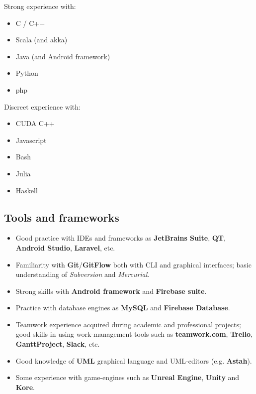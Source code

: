 \documentclass[letterpaper]{twentysecondcv} %
\begin{document}
\begin{minipage}[t]{0.45\linewidth}
	Strong experience with:
	\small
	\begin{itemize}[noitemsep]
		\item C / C++
		\item Scala (and akka)
		\item Java (and Android framework)
		\item Python
		\item php
	\end{itemize}
\end{minipage}
\begin{minipage}[t]{0.45\linewidth}
	Discreet experience with:
	\begin{itemize}[noitemsep,nolistsep]
		\item CUDA C++
		\item Javascript
		\item Bash
		\item Julia
		\item Haskell
	\end{itemize}
\end{minipage}


\subsection{Tools and frameworks}
\begin{itemize}[noitemsep,nolistsep]
	\item Good practice with IDEs and frameworks as \textbf{JetBrains Suite}, \textbf{QT}, \textbf{Android Studio}, \textbf{Laravel}, etc.
	\item Familiarity with \textbf{Git}/\textbf{GitFlow} both with CLI and graphical interfaces; basic understanding of \textit{Subversion} and \textit{Mercurial}.
	\item Strong skills with \textbf{Android framework} and \textbf{Firebase suite}.
	\item Practice with database engines as \textbf{MySQL} and \textbf{Firebase Database}.
	\item Teamwork experience acquired during academic and professional projects; good skills in using work-management tools such as \textbf{teamwork.com}, \textbf{Trello}, \textbf{GanttProject}, \textbf{Slack}, etc.
	\item Good knowledge of \textbf{UML} graphical language and UML-editors (e.g. \textbf{Astah}).
	\item Some experience with game-engines such as \textbf{Unreal Engine}, \textbf{Unity} and \textbf{Kore}.
\end{itemize}
\end{document}
